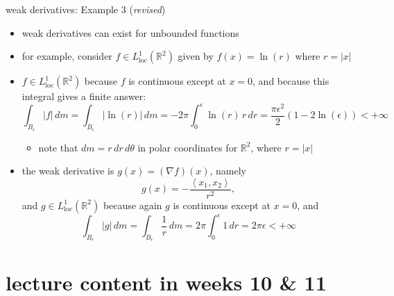 \documentclass[10pt,
               svgnames,
               hyperref={colorlinks,
                         citecolor=DeepPink4,
                         linkcolor=FireBrick,
                         urlcolor=blue},
               usepdftitle=false]{beamer}
\newcommand{\RR}{\mathbb{R}}
\newcommand{\grad}{\nabla}
\newcommand{\eps}{\epsilon}
\newcommand{\Lloc}{L_{\text{loc}}^1}
\begin{document}
\begin{frame}{weak derivatives: Example 3 (\emph{revised})}

\begin{itemize}
\item weak derivatives can exist for unbounded functions
\item for example, consider $f\in\Lloc(\RR^2)$ given by $f(x) = \ln(r)$ where $r=|x|$
\item $f\in\Lloc(\RR^2)$ because $f$ is continuous except at $x=0$, and because this integral gives a finite answer:
	$$\int_{B_\eps} |f|\,dm = \int_{B_\eps} |\ln(r)|\,dm = - 2\pi \int_0^\eps \ln(r) \,r\,dr = \frac{\pi\eps^2}{2}(1-2\ln(\eps)) < +\infty$$

    \begin{itemize}
    \item[$\circ$] note that $dm = r\,dr\,d\theta$ in polar coordinates for $\RR^2$, where $r=|x|$
    \end{itemize}
\item the weak derivative is $g(x) = (\grad f)(x)$, namely
	$$g(x) = -\frac{\left<x_1,x_2\right>}{r^2},$$
and $g\in \Lloc(\RR^2)$ because again $g$ is continuous except at $x=0$, and
	$$\int_{B_\eps} |g|\,dm = \int_{B_\eps} \frac{1}{r}\,dm = 2\pi \int_0^\eps 1\,dr = 2\pi\eps<+\infty$$
\end{itemize}
\end{frame}


\section{lecture content in weeks 10 \& 11}
\end{document}
